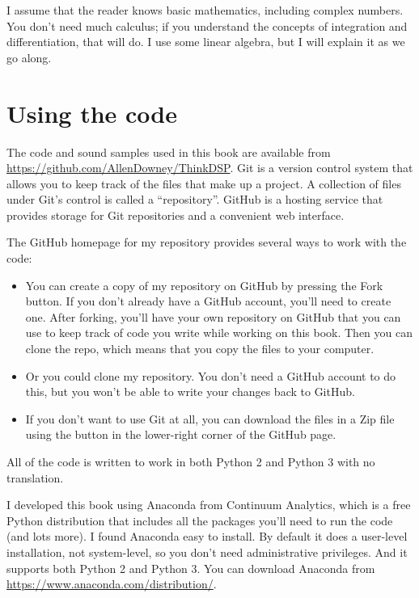 I assume that the reader knows basic mathematics, including complex
numbers.  You don't need much calculus; if you understand the concepts
of integration and differentiation, that will do.
I use some linear algebra, but I will explain it as we
go along.


\section{Using the code}
\label{code}

The code and sound samples used in this book are available from
\url{https://github.com/AllenDowney/ThinkDSP}.  Git is a version
control system that allows you to keep track of the files that
make up a project.  A collection of files under Git's control is
called a ``repository''.  GitHub is a hosting service that provides
storage for Git repositories and a convenient web interface.

The GitHub homepage for my repository provides several ways to
work with the code:

\begin{itemize}
	
	\item You can create a copy of my repository
	on GitHub by pressing the {\sf Fork} button.  If you don't already
	have a GitHub account, you'll need to create one.  After forking, you'll
	have your own repository on GitHub that you can use to keep track
	of code you write while working on this book.  Then you can
	clone the repo, which means that you copy the files
	to your computer.
	
	\item Or you could clone
	my repository.  You don't need a GitHub account to do this, but you
	won't be able to write your changes back to GitHub.
	
	\item If you don't want to use Git at all, you can download the files
	in a Zip file using the button in the lower-right corner of the
	GitHub page.
	
\end{itemize}

All of the code is written to work in both Python 2 and Python 3
with no translation.

I developed this book using Anaconda from
Continuum Analytics, which is a free Python distribution that includes
all the packages you'll need to run the code (and lots more).
I found Anaconda easy to install.  By default it does a user-level
installation, not system-level, so you don't need administrative
privileges.  And it supports both Python 2 and Python 3.  You can
download Anaconda from \url{https://www.anaconda.com/distribution/}.

